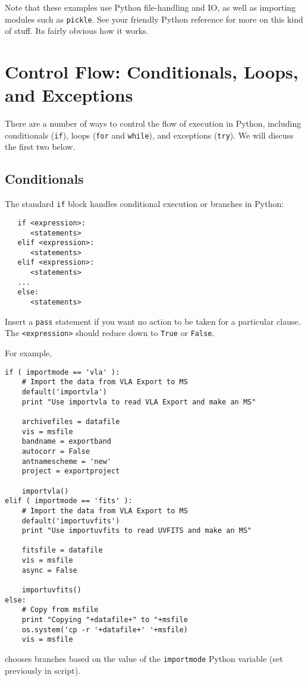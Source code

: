 Note that these examples use Python file-handling and IO, as well
as importing modules such as {\tt pickle}.  See your friendly
Python reference for more on this kind of stuff.  Its fairly obvious
how it works.

\section{Control Flow: Conditionals, Loops, and Exceptions}
\label{section:python.control}

There are a number of ways to control the flow of execution in
Python, including conditionals ({\tt if}), loops
({\tt for} and {\tt while}), and exceptions ({\tt try}).  We will
discuss the first two below.

\subsection{Conditionals}
\label{section:python.control.if}

The standard {\tt if} block handles conditional execution or branches
in Python:
\small
\begin{verbatim}
   if <expression>:
      <statements>
   elif <expression>:
      <statements>
   elif <expression>:
      <statements>
   ...
   else:
      <statements>

\end{verbatim}
\normalsize
Insert a {\tt pass} statement if you want no action to be taken
for a particular clause.  The {\tt <expression>} should reduce down
to {\tt True} or {\tt False}.

For example,
\small
\begin{verbatim}
if ( importmode == 'vla' ):
    # Import the data from VLA Export to MS
    default('importvla')
    print "Use importvla to read VLA Export and make an MS"
    
    archivefiles = datafile
    vis = msfile
    bandname = exportband
    autocorr = False
    antnamescheme = 'new'
    project = exportproject
    
    importvla()
elif ( importmode == 'fits' ):
    # Import the data from VLA Export to MS
    default('importuvfits')
    print "Use importuvfits to read UVFITS and make an MS"
   
    fitsfile = datafile
    vis = msfile
    async = False
    
    importuvfits()
else:
    # Copy from msfile
    print "Copying "+datafile+" to "+msfile
    os.system('cp -r '+datafile+' '+msfile)
    vis = msfile

\end{verbatim}
\normalsize
chooses branches based on the value of the {\tt importmode} Python
variable (set previously in script).


